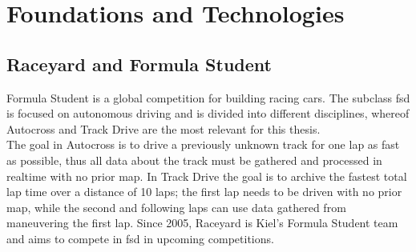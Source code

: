 

\graphicspath{{Chapter/Figs/FoundationsAndTechnologies/}}
\chapter{Foundations and Technologies}

\section{Raceyard and Formula Student}
Formula Student is a global competition for building racing cars. The subclass \ac{fsd} is focused on autonomous driving and is divided into different disciplines, whereof Autocross and Track Drive are the most relevant for this thesis.\\The goal in Autocross is to drive a previously unknown track for one lap as fast as possible, thus all data about the track must be gathered and processed in realtime with no prior map. In Track Drive the goal is to archive the fastest total lap time over a distance of 10 laps; the first lap needs to be driven with no prior map, while the second and following laps can use data gathered from maneuvering the first lap.
Since 2005, Raceyard is Kiel's Formula Student team and aims to compete in \ac{fsd} in upcoming competitions.



